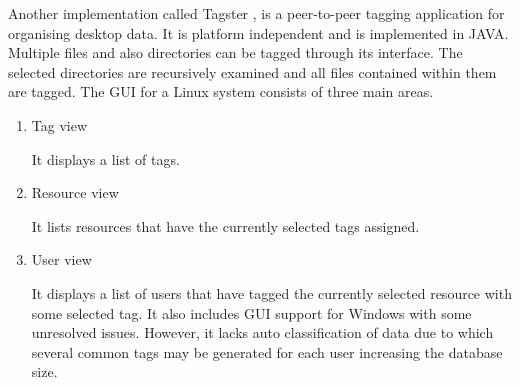 Another implementation called Tagster\cite{TAGSTER} , is a peer-to-peer tagging application for
organising desktop data. It is platform independent and is implemented in JAVA. Multiple
files and also directories can be tagged through its interface. The selected directories are
recursively examined and all files contained within them are tagged. The GUI for a Linux
system consists of three main areas.

\begin{enumerate}
 \item Tag view 
 
 It displays a list of tags.
  
\item Resource view 

 It lists resources that have the currently selected tags assigned.
\item User view

 It displays a list of users that have tagged the currently selected resource
with some selected tag. It also includes GUI support for Windows with some unresolved
issues. However, it lacks auto classification of data due to which several common tags
may be generated for each user increasing the database size.

 \end{enumerate} 


